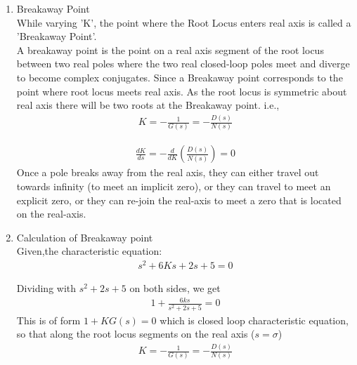 \begin{enumerate}[label=\thesection.\arabic*.,ref=\thesection.\theenumi]
    
    

\item Breakaway Point \\
    While varying 'K', the point where the Root Locus enters real axis is called a 'Breakaway Point'. \\
A breakaway point is the point on a real axis segment of the root locus between two real poles where the two real closed-loop poles meet and diverge to become complex conjugates. Since a Breakaway point corresponds to the point where root locus meets real axis. As the root locus is symmetric about real axis there will be two roots at the Breakaway point. 
i.e.,
    \begin{align}
        K=-\frac{1}{G(s)}=-\frac{D(s)}{N(s)}    
    \end{align}

    \begin{align}
        \frac{d K}{d s}=-\frac{d}{d K}\left(\frac{D(s)}{N(s)}\right)=0 
    \end{align}
    Once a pole breaks away from the real axis, they can either travel out towards infinity (to meet an implicit zero), or they can travel to meet an explicit zero, or they can re-join the real-axis to meet a zero that is located on the real-axis. 

\item Calculation of Breakaway point \\

Given,the characteristic equation:
    \begin{align}
        s^2 + 6Ks + 2s + 5 = 0    
    \end{align}
    
    Dividing with $s^2 + 2s + 5$ on both sides, we get
    \begin{align}
        1+\frac{6 k s}{s^{2}+2 s+5}=0    
    \end{align}
    This is of form $1+KG(s)=0$ which is closed loop characteristic equation, so that along the root locus
    segments on the real axis ($s = \sigma$)
    \begin{align}
        K=-\frac{1}{G(s)}=-\frac{D(s)}{N(s)}    
    \end{align}


\end{enumerate}
